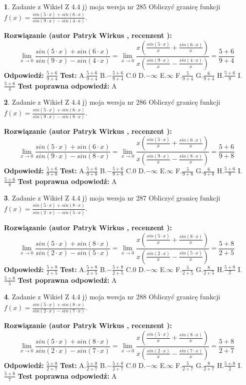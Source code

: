 \documentclass[12pt, a4paper]{article}
\theoremstyle{definition} %
\newtheorem{zad}{}
\newcommand{\zadStart}[1]{\begin{zad}#1\newline}
\newcommand{\zadStop}{\end{zad}}
\newcommand{\rozwStart}[2]{\noindent \textbf{Rozwiązanie (autor #1 , recenzent #2): }\newline}
\newcommand{\rozwStop}{\newline}
\newcommand{\odpStart}{\noindent \textbf{Odpowiedź:}\newline}
\newcommand{\odpStop}{\newline}
\newcommand{\testStart}{\noindent \textbf{Test:}\newline}
\newcommand{\testStop}{\newline}
\newcommand{\kluczStart}{\noindent \textbf{Test poprawna odpowiedź:}\newline}
\newcommand{\kluczStop}{\newline}
\begin{document}
\zadStart{Zadanie z Wikieł Z 4.4 j) moja wersja nr 285}
Obliczyć granicę funkcji $f(x)=\frac{sin(5\cdot x) +sin(6\cdot x)}{sin(9\cdot x) -sin(4\cdot x)}$.
\zadStop
\rozwStart{Patryk Wirkus}{}
$$\lim\limits_{x\to 0}\frac{sin(5\cdot x) +sin(6\cdot x)}{sin(9\cdot x) -sin(4\cdot x)}=\lim\limits_{x\to 0}\frac{x(\frac{sin(5\cdot x)}{x}+\frac{sin(6\cdot x)}{x})}{x(\frac{sin(9\cdot x)}{x}-\frac{sin(4\cdot x)}{x})}=\frac{5+6}{9+4}$$
\rozwStop
\odpStart
$\frac{5+6}{9+4}$
\odpStop
\testStart
A.$\frac{5+6}{9+4}$
B.$-\frac{5+6}{9+4}$
C.$0$
D.$-\infty$
E.$\infty$
F.$\frac{5}{9+4}$
G.$\frac{6}{9+4}$
H.$\frac{5+6}{9}$
I.$\frac{5+6}{4}$
\testStop
\kluczStart
A
\kluczStop



\zadStart{Zadanie z Wikieł Z 4.4 j) moja wersja nr 286}
Obliczyć granicę funkcji $f(x)=\frac{sin(5\cdot x) +sin(6\cdot x)}{sin(9\cdot x) -sin(8\cdot x)}$.
\zadStop
\rozwStart{Patryk Wirkus}{}
$$\lim\limits_{x\to 0}\frac{sin(5\cdot x) +sin(6\cdot x)}{sin(9\cdot x) -sin(8\cdot x)}=\lim\limits_{x\to 0}\frac{x(\frac{sin(5\cdot x)}{x}+\frac{sin(6\cdot x)}{x})}{x(\frac{sin(9\cdot x)}{x}-\frac{sin(8\cdot x)}{x})}=\frac{5+6}{9+8}$$
\rozwStop
\odpStart
$\frac{5+6}{9+8}$
\odpStop
\testStart
A.$\frac{5+6}{9+8}$
B.$-\frac{5+6}{9+8}$
C.$0$
D.$-\infty$
E.$\infty$
F.$\frac{5}{9+8}$
G.$\frac{6}{9+8}$
H.$\frac{5+6}{9}$
I.$\frac{5+6}{8}$
\testStop
\kluczStart
A
\kluczStop



\zadStart{Zadanie z Wikieł Z 4.4 j) moja wersja nr 287}
Obliczyć granicę funkcji $f(x)=\frac{sin(5\cdot x) +sin(8\cdot x)}{sin(2\cdot x) -sin(5\cdot x)}$.
\zadStop
\rozwStart{Patryk Wirkus}{}
$$\lim\limits_{x\to 0}\frac{sin(5\cdot x) +sin(8\cdot x)}{sin(2\cdot x) -sin(5\cdot x)}=\lim\limits_{x\to 0}\frac{x(\frac{sin(5\cdot x)}{x}+\frac{sin(8\cdot x)}{x})}{x(\frac{sin(2\cdot x)}{x}-\frac{sin(5\cdot x)}{x})}=\frac{5+8}{2+5}$$
\rozwStop
\odpStart
$\frac{5+8}{2+5}$
\odpStop
\testStart
A.$\frac{5+8}{2+5}$
B.$-\frac{5+8}{2+5}$
C.$0$
D.$-\infty$
E.$\infty$
F.$\frac{5}{2+5}$
G.$\frac{8}{2+5}$
H.$\frac{5+8}{2}$
I.$\frac{5+8}{5}$
\testStop
\kluczStart
A
\kluczStop



\zadStart{Zadanie z Wikieł Z 4.4 j) moja wersja nr 288}
Obliczyć granicę funkcji $f(x)=\frac{sin(5\cdot x) +sin(8\cdot x)}{sin(2\cdot x) -sin(7\cdot x)}$.
\zadStop
\rozwStart{Patryk Wirkus}{}
$$\lim\limits_{x\to 0}\frac{sin(5\cdot x) +sin(8\cdot x)}{sin(2\cdot x) -sin(7\cdot x)}=\lim\limits_{x\to 0}\frac{x(\frac{sin(5\cdot x)}{x}+\frac{sin(8\cdot x)}{x})}{x(\frac{sin(2\cdot x)}{x}-\frac{sin(7\cdot x)}{x})}=\frac{5+8}{2+7}$$
\rozwStop
\odpStart
$\frac{5+8}{2+7}$
\odpStop
\testStart
A.$\frac{5+8}{2+7}$
B.$-\frac{5+8}{2+7}$
C.$0$
D.$-\infty$
E.$\infty$
F.$\frac{5}{2+7}$
G.$\frac{8}{2+7}$
H.$\frac{5+8}{2}$
I.$\frac{5+8}{7}$
\testStop
\kluczStart
A
\kluczStop
\end{document}
